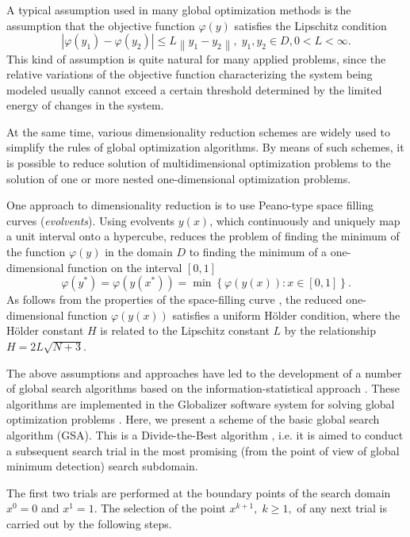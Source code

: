 \documentclass{aip-cp}
\begin{document}
A typical assumption used in many global optimization methods \cite{Sergeyev2013,Evtushenko2013,Jones2009,Zilinskas2010,Pinter1996,Grishagin2016_1,Sergeyev2021} is the assumption that the objective function $\varphi(y)$ satisfies the Lipschitz condition
\[
\left|\varphi(y_1)-\varphi(y_2)\right|\leq L\left\|y_1-y_2\right\|,\; y_1,y_2 \in D, 0<L<\infty.
\]
This kind of assumption is quite natural for many applied problems, since the relative variations of the objective function characterizing the system being modeled usually cannot exceed a certain threshold determined by the limited energy of changes in the system.

At the same time, various dimensionality reduction schemes are widely used to simplify the rules of global optimization algorithms. By means of such schemes, it is possible to reduce solution of multidimensional optimization problems to the solution of one or more nested one-dimensional optimization problems.

One approach to dimensionality reduction is to use Peano-type space filling curves (\textit{evolvents}). Using evolvents $y(x)$, which continuously and uniquely map a unit interval onto a hypercube, reduces the problem of finding the minimum of the function $\varphi(y)$ in the domain $D$ to finding the minimum of a one-dimensional function  on the interval $[0,1]$
\[
\varphi(y^\ast)=\varphi(y(x^\ast))=\min{\left\{\varphi(y(x)): x\in[0,1]\right\}}.
\]
As follows from the properties of the space-filling curve \cite{Sergeyev2013}, the reduced one-dimensional function $\varphi(y(x))$ satisfies a uniform H{\"o}lder condition,
where the H{\"o}lder constant $H$ is related to the Lipschitz constant $L$ by the relationship $H=2L\sqrt{N+3}$.

The above assumptions and approaches have led to the development of a number of global search algorithms based on the information-statistical approach \cite{Strongin2000}. These algorithms are implemented in the Globalizer software system for solving global optimization problems \cite{globalizerSystem}. Here, we present a scheme of the basic global search algorithm (GSA). This is a Divide-the-Best algorithm \cite{Sergeyev1998}, i.e. it is aimed to conduct a subsequent search trial in the most promising (from the point of view of global minimum detection) search subdomain.

The first two trials are performed at the boundary points of the search domain $x^0 = 0$ and $x^1 = 1$. The selection of the point  $x^{k+1}, \; k \geq 1,$  of any next trial is carried out by the following steps.
\end{document}
